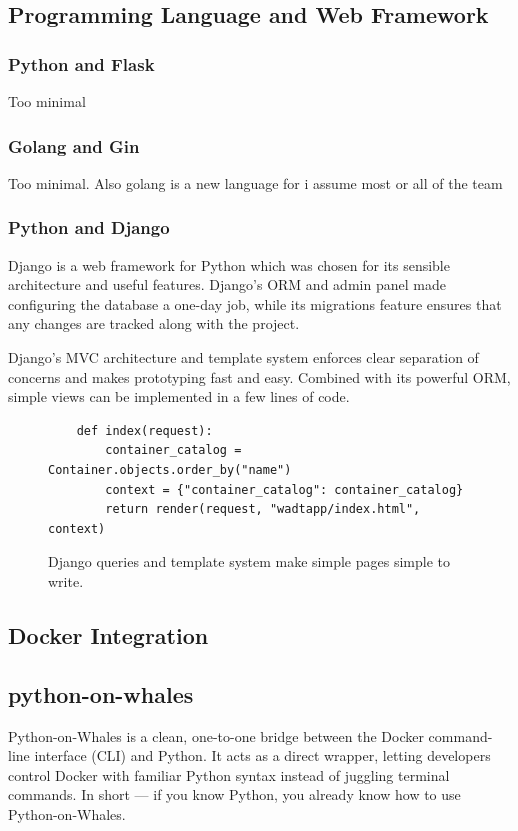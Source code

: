 \documentclass[12pt]{article}
\begin{document}
\subsection{Programming Language and Web Framework}

\subsubsection{Python and Flask}
Too minimal

\subsubsection{Golang and Gin}
Too minimal. Also golang is a new language for i assume most or all of the team

\subsubsection{Python and Django}
Django is a web framework for Python which was chosen for its sensible architecture and useful features. Django's ORM and admin panel made configuring the database a one-day job, while its migrations feature ensures that any changes are tracked along with the project.

Django's MVC architecture and template system enforces clear separation of concerns and makes prototyping fast and easy. Combined with its powerful ORM, simple views can be implemented in a few lines of code.
\begin{figure}[H]
	\centering
	\begin{verbatim}
	def index(request):
	    container_catalog = Container.objects.order_by("name")
	    context = {"container_catalog": container_catalog}
	    return render(request, "wadtapp/index.html", context)
	\end{verbatim}
	\caption{Django queries and template system make simple pages simple to write.}
	\label{fig:indexview}
\end{figure}

\subsection{Docker Integration}

\subsection{python-on-whales}
Python-on-Whales is a clean, one-to-one bridge between the Docker command-line interface (CLI) and Python. 
It acts as a direct wrapper, letting developers control Docker with familiar Python syntax instead of juggling terminal commands. 
In short — if you know Python, you already know how to use Python-on-Whales.
\end{document}
